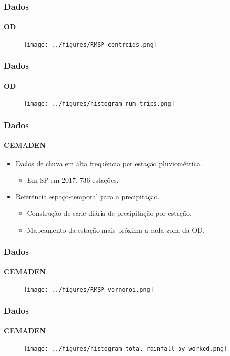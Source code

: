 \begin{frame}[plain]
    \frametitle{Dados}
    \framesubtitle{OD}
    \begin{figure}[H]
        \centering
        \texttt{[image: ../figures/RMSP\_centroids.png]}
        \label{fig:od_centroids}
    \end{figure} 
\end{frame}
\begin{frame}[plain]
    \frametitle{Dados}
    \framesubtitle{OD}
    \begin{figure}[H]
        \centering
        \texttt{[image: ../figures/histogram\_num\_trips.png]}
        \label{fig:hist_num_trips}
    \end{figure} 
\end{frame}

\begin{frame}
    \frametitle{Dados}
    \framesubtitle{CEMADEN}
    \begin{itemize}
    \item Dados de chuva em alta frequência por estação pluviométrica.
    \begin{itemize}
        \item Em SP em 2017, 736 estações.
    \end{itemize}
    \item Referência espaço-temporal para a precipitação.\begin{itemize}
        \item Construção de série diária de precipitação por estação.
        \item Mapeamento da estação mais próxima a cada zona da OD.
    \end{itemize}
    \end{itemize}
\end{frame}

\begin{frame}[plain]
    \frametitle{Dados}
    \framesubtitle{CEMADEN}
    \begin{figure}[H]
        \centering
        \texttt{[image: ../figures/RMSP\_vornonoi.png]}
        \label{fig:cemaden_voronoi}
    \end{figure} 
\end{frame}
\begin{frame}[plain]
    \frametitle{Dados}
    \framesubtitle{CEMADEN}
    \begin{figure}[H]
        \centering
        \texttt{[image: ../figures/histogram\_total\_rainfall\_by\_worked.png]}
        \label{fig:hist_total_rainfall_by_worked}
    \end{figure} 
\end{frame}


